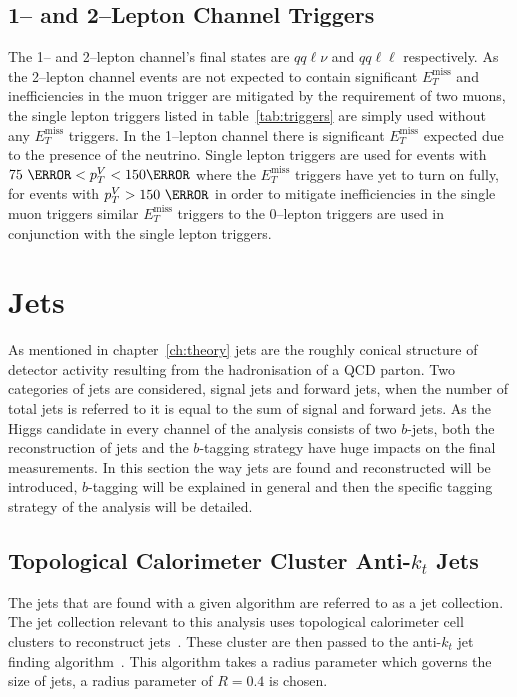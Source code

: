 \subsection{1-- and 2--Lepton Channel Triggers}
The 1-- and 2--lepton channel's final states are $qq\ell\nu$ and $qq\ell\ell$
respectively. As the 2--lepton channel events are not expected to contain
significant $E_T^{\text{miss}}$ and inefficiencies in the muon trigger are
mitigated by the requirement of two muons, the single lepton triggers listed in
table~\ref{tab:triggers} are simply used without any $E_T^{\text{miss}}$
triggers. In the 1--lepton channel there is significant $E_T^{\text{miss}}$
expected due to the presence of the neutrino. Single lepton triggers are used
for events with $75~\GeV < p_T^{V} < 150 \GeV$ where the $E_T^{\text{miss}}$
triggers have yet to turn on fully, for events with $p_T^{V} > 150~\GeV$ in
order to mitigate inefficiencies in the single muon triggers similar
$E_T^{\text{miss}}$ triggers to the 0--lepton triggers are used in conjunction
with the single lepton triggers.

\section{Jets}
\label{sec:jets}

As mentioned in chapter~\ref{ch:theory} jets are the roughly conical structure
of detector activity resulting from the hadronisation of a QCD parton. Two
categories of jets are considered, signal jets and forward jets, when the number
of total jets is referred to it is equal to the sum of signal and forward jets.
As the Higgs candidate in every channel of the analysis consists of two
$b$-jets, both the reconstruction of jets and the $b$-tagging strategy have huge
impacts on the final measurements. In this section the way jets are found and
reconstructed will be introduced, $b$-tagging will be explained in general and
then the specific tagging strategy of the analysis will be detailed.

\subsection{Topological Calorimeter Cluster Anti-$k_t$ Jets}
The jets that are found with a given algorithm are referred to as a jet
collection. The jet collection relevant to this analysis uses topological
calorimeter cell clusters to reconstruct jets~\cite{CALO2008}. These cluster are
then passed to the anti-$k_t$ jet finding algorithm~\cite{anti-kt}. This
algorithm takes a radius parameter which governs the size of jets, a radius
parameter of $R=0.4$ is chosen.


